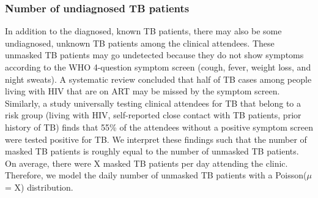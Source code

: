 \documentclass[fleqn,11pt]{wlscirep_supp}
\begin{document}
\subsubsection{Number of undiagnosed TB patients}


In addition to the diagnosed, known TB patients, there may also be some undiagnosed, unknown TB patients among the clinical attendees. These unmasked TB patients may go undetected because they do not show symptoms according to the WHO 4-question symptom screen (cough, fever, weight loss, and night sweats). A systematic review concluded that half of TB cases among people living with HIV that are on ART may be missed by the symptom screen\cite{Hamada2018LancetHIV}. Similarly, a study universally testing clinical attendees for TB that belong to a risk group (living with HIV, self-reported close contact with TB patients, prior history of TB) finds that 55\% of the attendees without a positive symptom screen were tested positive for TB\cite{Berhanu2023CID}. We interpret these findings such that the number of masked TB patients is roughly equal to the number of unmasked TB patients. On average, there were X masked TB patients per day attending the clinic. Therefore, we model the daily number of unmasked TB patients with a Poisson($\mu$ = X) distribution. 





\clearpage


\end{document}
